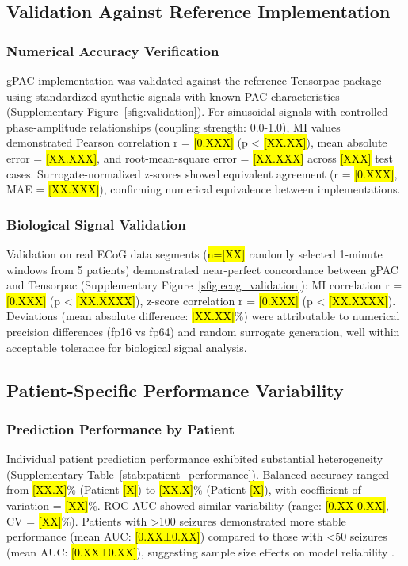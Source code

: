 \subsection{Validation Against Reference Implementation}
\subsubsection{Numerical Accuracy Verification}
gPAC implementation was validated against the reference Tensorpac package \cite{Combrisson2020TensorpacAOAH} using standardized synthetic signals with known PAC characteristics (Supplementary Figure~\ref{sfig:validation}). For sinusoidal signals with controlled phase-amplitude relationships (coupling strength: 0.0-1.0), MI values demonstrated Pearson correlation r = \hl{[0.XXX]} (p < \hl{[XX.XX]}), mean absolute error = \hl{[XX.XXX]}, and root-mean-square error = \hl{[XX.XXX]} across \hl{[XXX]} test cases. Surrogate-normalized z-scores showed equivalent agreement (r = \hl{[0.XXX]}, MAE = \hl{[XX.XXX]}), confirming numerical equivalence between implementations.

\subsubsection{Biological Signal Validation}
Validation on real ECoG data segments (\hl{n=[XX]} randomly selected 1-minute windows from 5 patients) demonstrated near-perfect concordance between gPAC and Tensorpac (Supplementary Figure~\ref{sfig:ecog_validation}): MI correlation r = \hl{[0.XXX]} (p < \hl{[XX.XXXX]}), z-score correlation r = \hl{[0.XXX]} (p < \hl{[XX.XXXX]}). Deviations (mean absolute difference: \hl{[XX.XX]}\%) were attributable to numerical precision differences (fp16 vs fp64) and random surrogate generation, well within acceptable tolerance for biological signal analysis.

\subsection{Patient-Specific Performance Variability}
\subsubsection{Prediction Performance by Patient}
Individual patient prediction performance exhibited substantial heterogeneity (Supplementary Table~\ref{stab:patient_performance}). Balanced accuracy ranged from \hl{[XX.X]}\% (Patient \hl{[X]}) to \hl{[XX.X]}\% (Patient \hl{[X]}), with coefficient of variation = \hl{[XX]}\%. ROC-AUC showed similar variability (range: \hl{[0.XX-0.XX]}, CV = \hl{[XX]}\%). Patients with >100 seizures demonstrated more stable performance (mean AUC: \hl{[0.XX±0.XX]}) compared to those with <50 seizures (mean AUC: \hl{[0.XX±0.XX]}), suggesting sample size effects on model reliability \cite{Aldahr2023PatientSpecificPPL,Pinto2021APAP}.

